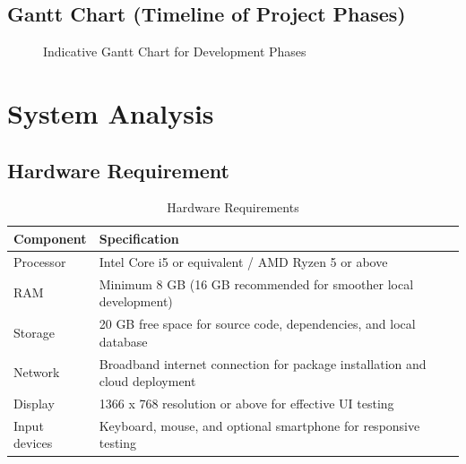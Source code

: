 \documentclass[12pt,a4paper,oneside]{report}
\begin{document}
\section{Gantt Chart (Timeline of Project Phases)}
\begin{figure}[H]
\centering
{}
\caption{Indicative Gantt Chart for Development Phases}
\end{figure}

\chapter{System Analysis}

\section{Hardware Requirement}
\begin{table}[H]
\centering
\caption{Hardware Requirements}
\begin{tabularx}{\textwidth}{p{2.3in}Y}
\toprule
\textbf{Component} & \textbf{Specification} \\
\midrule
Processor & Intel Core i5 or equivalent / AMD Ryzen 5 or above \\
RAM & Minimum 8 GB (16 GB recommended for smoother local development) \\
Storage & 20 GB free space for source code, dependencies, and local database \\
Network & Broadband internet connection for package installation and cloud deployment \\
Display & 1366 x 768 resolution or above for effective UI testing \\
Input devices & Keyboard, mouse, and optional smartphone for responsive testing \\
\bottomrule
\end{tabularx}
\end{table}
\end{document}
